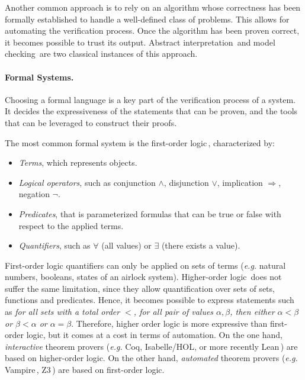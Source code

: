 Another common approach is to rely on an algorithm whose correctness has been
formally established to handle a well-defined class of problems.
%
This allows for automating the verification process.
%
Once the algorithm has been proven correct, it becomes possible to trust its
output.
%
Abstract interpretation\,\cite{cousot1977absint} and model
checking\,\cite{clarke2018modelc} are two classical instances of this approach.

\paragraph{Formal Systems.}
%
Choosing a formal language is a key part of the verification process of a
system.
%
It decides the expressiveness of the statements that can be proven, and the
tools that can be leveraged to construct their proofs.

The most common formal system is the first-order logic\,\cite{smullyan2012fol},
characterized by:
%
\begin{itemize}
\item \emph{Terms}, which represents objects.
\item \emph{Logical operators}, such as conjunction \( \wedge \), disjunction
  \( \vee \), implication \( \Rightarrow \), negation \( \neg \).
\item \emph{Predicates}, that is parameterized formulas that can be true or
  false with respect to the applied terms.
\item \emph{Quantifiers}, such as \( \forall \) (all values) or \( \exists \)
  (there exists a value).
\end{itemize}

First-order logic quantifiers can only be applied on sets of terms (\emph{e.g.}
natural numbers, booleans, states of an airlock system).
%
Higher-order logic\,\cite{leivant1994hol} does not suffer the same limitation,
since they allow quantification over sets of sets, functions and predicates.
%
Hence, it becomes possible to express statements such as \emph{for all sets with
  a total order \( < \), for all pair of values \( \alpha, \beta \), then either
  \( \alpha < \beta \) or \( \beta < \alpha \) or \( \alpha = \beta \)}.
%
Therefore, higher order logic is more expressive than first-order logic, but it
comes at a cost in terms of automation.
%
On the one hand, \emph{interactive} theorem provers (\emph{e.g.}  Coq,
Isabelle/HOL, or more recently Lean\,\cite{de2015lean}) are based on
higher-order logic.
%
On the other hand, \emph{automated} theorem provers (\emph{e.g.}
Vampire\,\cite{riazanov2002vampire}, Z3\,\cite{de2008z3}) are based on
first-order logic.

